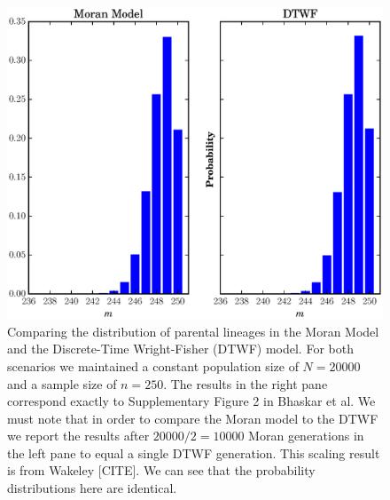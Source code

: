 \documentclass[10pt]{article}
\begin{document}
\begin{center}
	\begin{figure}[!h]
		\includegraphics[scale=0.85]{../plots/figure1}
		\caption{Comparing the distribution of parental lineages in the Moran Model and the Discrete-Time Wright-Fisher (DTWF) model. For both scenarios we maintained a constant population size of $N = 20000$ and a sample size of $n=250$. The results in the right pane correspond exactly to Supplementary Figure 2 in Bhaskar et al. We must note that in order to compare the Moran model to the DTWF we report the results after $20000/2 = 10000$ Moran generations in the left pane to equal a single DTWF generation. This scaling result is from Wakeley [CITE]. We can see that the probability distributions here are identical.}
	\end{figure}
\end{center}
\end{document}
